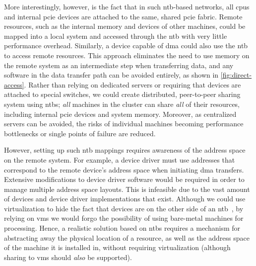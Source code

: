 More interestingly, however, is the fact that in such \gls{ntb}-based networks, all \glspl{cpu} and internal \gls{pcie} devices are attached to the same, shared \gls{pcie} fabric.
%
Remote resources, such as the internal memory and devices of other machines, could be mapped into a local system and accessed through the \gls{ntb} with very little performance overhead.
%
Similarly, a device capable of \gls{dma} could also use the \gls{ntb} to access remote resources.
%
This approach eliminates the need to use memory on the remote system as an intermediate step when transferring data, and any software in the data transfer path can be avoided entirely, as shown in \cref{fig:direct-access}.
%
Rather than relying on dedicated servers or requiring that devices are attached to special switches, we could create distributed, peer-to-peer sharing system using \glspl{ntb};
%
\emph{all} machines in the cluster can share \emph{all} of their resources, including internal \gls{pcie} devices and system memory. 
%
Moreover, as centralized servers can be avoided, the risks of individual machines becoming performance bottlenecks or single points of failure are reduced.




However, setting up such \gls{ntb} mappings requires awareness of the address space on the remote system.
%
For example, a device driver must use addresses that correspond to the remote device's address space when initiating \gls{dma} transfers.
%
Extensive modifications to device driver software would be required in order to manage multiple address space layouts.
%
This is infeasible due to the vast amount of devices and device driver implementations that exist. 
%
Although we could use virtualization to hide the fact that devices are on the other side of an \gls{ntb}~\cite{Tu2013}, by relying on \glspl{vm} we would forgo the possibility of using bare-metal machines for processing.
%
Hence, a realistic solution based on \glspl{ntb} requires a mechanism for abstracting away the physical location of a resource, as well as the address space of the machine it is installed in, without requiring virtualization (although sharing to \glspl{vm} should \emph{also} be supported).

